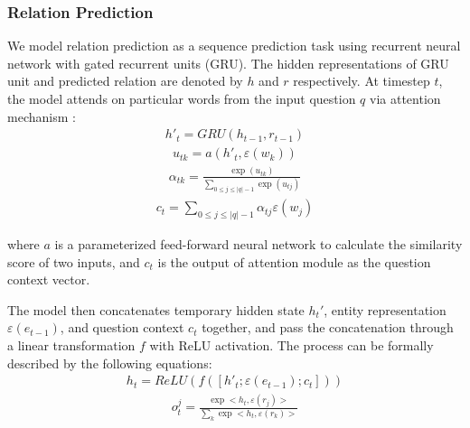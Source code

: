 
\subsubsection{Relation Prediction} We model relation prediction as a sequence prediction task using recurrent neural network with gated recurrent units (GRU). The hidden representations of GRU unit and predicted relation are denoted by $h$ and $r$ respectively. At timestep $t$, the model attends on particular words from the input question $q$ via attention mechanism \cite{DBLP:journals/corr/BahdanauCB14}:
\begin{align}
h'_{t} = GRU(h_{t-1}, r_{t-1}) 
\end{align}
\vspace{-3ex}
\begin{align}
u_{tk} = a(h'_{t},\varepsilon(w_k))
\end{align}
\vspace{-3ex}
\begin{align}
\alpha_{tk} = \frac{\exp (u_{tk})}{\sum_{0\leq j\leq |q|-1}\exp (u_{tj})}
\end{align}
\vspace{-1ex}
\begin{align}
c_t = \sum_{0\leq j\leq |q|-1}\alpha_{tj}\varepsilon(w_j)
\end{align}

where $a$ is a parameterized feed-forward neural network to calculate the similarity score of two inputs, and $c_t$ is the output of attention module as the question context vector. %

The model then concatenates temporary hidden state $h_{t}'$, entity representation $\varepsilon(e_{t-1})$, and question context $c_t$ together, and pass the concatenation through a linear transformation $f$ with ReLU activation. The process can be formally described by the following equations:
\begin{align}
h_t = ReLU(f([h'_{t}; \varepsilon(e_{t-1}); c_t]))
\end{align}
\vspace{-2ex}
\begin{align}
o^j_t = \frac{\exp <h_t,\varepsilon(r_j)>}{\sum_k\exp <h_t,\varepsilon(r_k)>}
\label{eq:r_prob}
\end{align}


